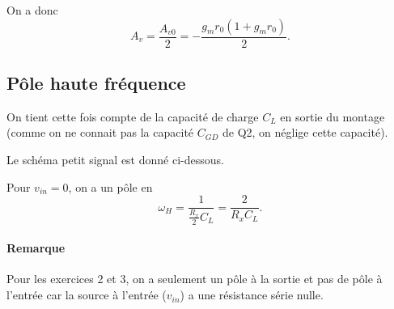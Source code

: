 \documentclass[frenchb,DIV=14]{scrartcl}
\begin{document}
On a donc \[A_v = \frac{A_{v0}}{2} = -\frac{g_mr_0(1+g_mr_0)}{2}.\]

\subsection*{Pôle haute fréquence}

On tient cette fois compte de la capacité de charge $C_L$ en sortie du montage
(comme on ne connait pas la capacité $C_{GD}$ de Q2, on néglige cette capacité).

Le schéma petit signal est donné ci-dessous.
\begin{center}
\end{center}

Pour $v_{in} = 0$, on a un pôle en
\[\omega_H = \frac{1}{\frac{R_{x}}{2}C_L} = \frac{2}{R_{x}C_L}.\]
\paragraph{Remarque} Pour les exercices 2 et 3, on a seulement un pôle à la sortie
et pas de pôle à l'entrée car la source à l'entrée ($v_{in}$) a une résistance
série nulle.
\end{document}
